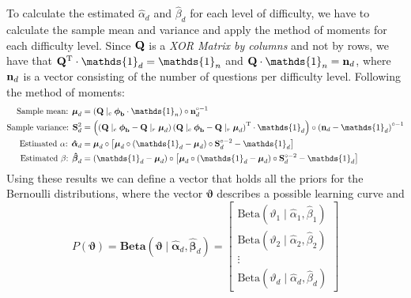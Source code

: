 \documentclass{article}
\newcommand{\0}{\mathbbold{0}}
\newcommand{\1}{\mathds{1}}
\newcommand{\2}{\mathbbold{2}}
\newcommand{\T}{^{\operatorname{T}}}
\newcommand{\Beta}[2]{\text{Beta}\!\left(#1,#2\right)}
\newcommand{\BBeta}[2]{\textbf{Beta}\!\left(#1,#2\right)}
\begin{document}
To calculate the estimated $\hat{\alpha}_d$ and $\hat{\beta}_d$ for each level of difficulty, we have to calculate the sample mean and variance and apply the method of moments for each difficulty level.
Since ${\bf Q}$ is a \textsl{XOR Matrix by columns} and not by rows, we have that ${\bf Q}\T \cdot \1_d = \1_n$ and ${\bf Q} \cdot \1_n = {\bf n}_d$, where ${\bf n}_d$ is a vector consisting of the number of questions per difficulty level.
Following the method of moments:
\begin{align*}
    \text{Sample mean: }{\boldsymbol \mu}_d &= \left( {\bf Q} \mid_c {\boldsymbol \phi}_{\bf b} \cdot \1_n \right) \circ {\bf n}_d^{\circ -1} \\
    \text{Sample variance: }{\bf S}_d^2 &= \left( \left({\bf Q} \mid_c {\boldsymbol \phi}_{\bf b} - {\bf Q} \mid_r {\boldsymbol \mu}_d\right)\left({\bf Q} \mid_c {\boldsymbol \phi}_{\bf b} - {\bf Q} \mid_r {\boldsymbol \mu}_d\right)\T \cdot \1_d \right) \circ \left( {\bf n}_d - \1_d \right)^{\circ -1} \\
    \text{Estimated }\alpha\text{: }\boldsymbol{\hat{\alpha}}_d &= {\boldsymbol \mu}_d \circ \left[ {\boldsymbol \mu}_d \circ \left( \1_d - {\boldsymbol \mu}_d \right) \circ {\bf S}_d^{\circ -2} - \1_d \right] \\
    \text{Estimated }\beta\text{: }\boldsymbol{\hat{\beta}}_d &= \left( \1_d - {\boldsymbol \mu}_d \right) \circ \left[ {\boldsymbol \mu}_d \circ \left( \1_d - {\boldsymbol \mu}_d \right) \circ {\bf S}_d^{\circ -2} - \1_d \right]
\end{align*}
Using these results we can define a vector that holds all the priors for the Bernoulli distributions, where the vector $\boldsymbol{\vartheta}$ describes a possible learning curve and
$$P({\boldsymbol \vartheta}) = \BBeta{\boldsymbol{\vartheta} \mid \boldsymbol{\hat{\alpha}}_d}{\boldsymbol{\hat{\beta}}_d} = \begin{bmatrix}
    \Beta{\vartheta_1 \mid \hat{\alpha}_1}{\hat{\beta}_1} \\
    \Beta{\vartheta_2 \mid \hat{\alpha}_2}{\hat{\beta}_2} \\
    \vdots \\
    \Beta{\vartheta_d \mid \hat{\alpha}_d}{\hat{\beta}_d}
\end{bmatrix} $$
\end{document}
